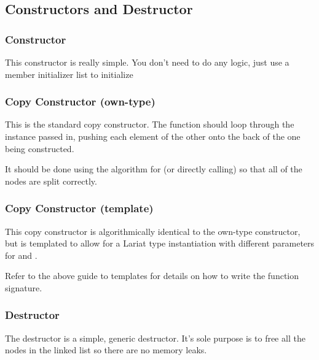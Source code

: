 \subsection{Constructors and Destructor}


\subsubsection{Constructor}
\indent This constructor is really simple. You don't need to do any logic, just
use a member initializer list to initialize

\subsubsection{Copy Constructor (own-type)}
\indent This is the standard copy constructor. The function should loop through the
instance passed in, pushing each element of the other onto the back of
the one being constructed.

\indent It should be done using the algorithm for (or directly calling) 
so that all of the nodes are split correctly.

\subsubsection{Copy Constructor (template)}
\indent This copy constructor is algorithmically identical to the own-type
constructor, but is templated to allow for a Lariat type instantiation
with different parameters for  and .

\indent Refer to the above guide to templates for details on how to write the
function signature.

\subsubsection{Destructor}
The destructor is a simple, generic destructor. It's sole purpose is to
free all the nodes in the linked list so there are no memory leaks.
